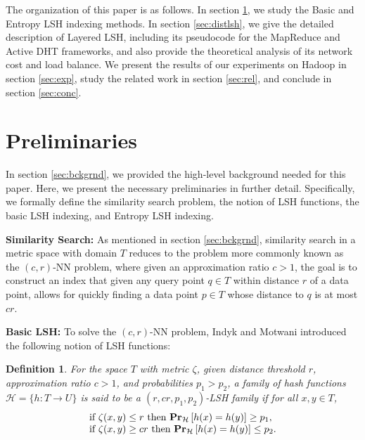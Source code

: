 \documentclass{acm_proc_article-sp}
\numberwithin{equation}{section}
\numberwithin{figure}{section}
\newtheorem{defn}[thm]{Definition}
\begin{document}
The organization of this paper is as follows. 
In section \ref{sec:prelim}, we study the Basic and Entropy LSH indexing methods. In section \ref{sec:distlsh}, we give the detailed description of Layered LSH, including its pseudocode for the MapReduce and Active DHT frameworks, and also provide the theoretical analysis of its network cost and load balance. We present the results of our experiments on Hadoop in section \ref{sec:exp}, study the related work in section \ref{sec:rel}, and conclude in section \ref{sec:conc}. 

\section{Preliminaries}
\label{sec:prelim}

In section \ref{sec:bckgrnd}, we provided the high-level background needed for this paper. Here, we present the necessary preliminaries in further detail. Specifically, we formally define the similarity search problem, the notion of LSH functions, the basic LSH indexing, and Entropy LSH indexing.

\noindent \textbf{Similarity Search:} As mentioned in section \ref{sec:bckgrnd}, similarity search in a metric space with domain $T$ reduces to the problem more commonly known as the $(c,r)$-NN problem, where given an approximation ratio $c>1$, the goal is to construct an index that given any query point $q\in T$ within distance $r$ of a data point, allows for quickly finding a data point $p\in T$ whose distance to $q$ is at most $cr$.



\noindent \textbf{Basic LSH:} To solve the $(c,r)$-NN problem, Indyk and Motwani \cite{im98} introduced the following notion of LSH functions:

\newcommand{\norm}[1]{{\left\Vert#1\right\Vert}_2}
\newcommand{\probH}[1]{{\bf\mbox{\bf Pr}}_{\mathcal{H}}\left[#1\right]}
\newcommand{\etal}{{\em et al. }}
\begin{defn}
\label{def:LSH}
For the space $T$ with metric $\zeta$,  given distance threshold $r$, approximation ratio $c>1$, and probabilities $p_1>p_2$, a family of hash functions $\mathcal{H} = \{h: T \to U\}$ is said to be a $(r,cr,p_1,p_2)$-LSH family if for all $x,y \in T$, 
\begin{equation}\begin{array}{l}
\text{if } \zeta(x,y) \leq r \text{ then } \probH{h(x)=h(y)} \geq p_1, \\ 
\text{if } \zeta(x,y) \geq cr \text{ then } \probH{h(x)=h(y)} \leq p_2. \\
\end{array}\end{equation}
\end{defn}
\end{document}
